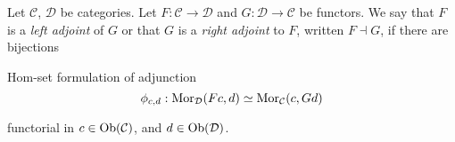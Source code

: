 \begin{frame}
Let $\mathcal{C}$, $\mathcal{D}$ be categories.
Let $F : \mathcal{C} \to \mathcal{D}$ and
$G : \mathcal{D} \to \mathcal{C}$ be functors.
We say that $F$ is a {\it left adjoint} of $G$ or that
$G$ is a {\it right adjoint} to $F$, written $F \dashv G$, if there are bijections
\begin{block}{Hom-set formulation of adjunction}
$$
\phi_{c,d}:\mathop{\rm Mor}\nolimits_\mathcal{D}(Fc, d)
\simeq
\mathop{\rm Mor}\nolimits_\mathcal{C}(c, Gd)
$$
\end{block}
functorial in $c \in \mathop{\rm Ob}\nolimits(\mathcal{C})$, and
$d \in \mathop{\rm Ob}\nolimits(\mathcal{D})$.
\end{frame}
